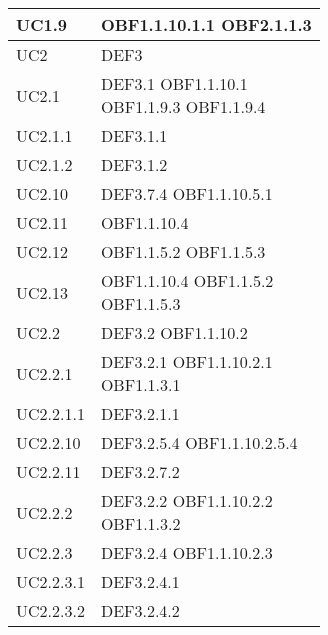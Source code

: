 \documentclass{scalatekids-article}
\begin{document}
\begin{longtable}[H]{|p{5.5cm}|p{5.5cm}|}
\hline
UC1.9 & \multiLineCell[t]{OBF1.1.10.1.1 OBF2.1.1.3\\}\\
\hline
UC2 & \multiLineCell[t]{DEF3\\}\\
\hline
UC2.1 & \multiLineCell[t]{DEF3.1 OBF1.1.10.1\\OBF1.1.9.3 OBF1.1.9.4\\}\\
\hline
UC2.1.1 & \multiLineCell[t]{DEF3.1.1\\}\\
\hline
UC2.1.2 & \multiLineCell[t]{DEF3.1.2\\}\\
\hline
UC2.10 & \multiLineCell[t]{DEF3.7.4 OBF1.1.10.5.1\\}\\
\hline
UC2.11 & \multiLineCell[t]{OBF1.1.10.4\\}\\
\hline
UC2.12 & \multiLineCell[t]{OBF1.1.5.2 OBF1.1.5.3\\}\\
\hline
UC2.13 & \multiLineCell[t]{OBF1.1.10.4 OBF1.1.5.2\\OBF1.1.5.3}\\
\hline
UC2.2 & \multiLineCell[t]{DEF3.2 OBF1.1.10.2\\}\\
\hline
UC2.2.1 & \multiLineCell[t]{DEF3.2.1 OBF1.1.10.2.1\\OBF1.1.3.1}\\
\hline
UC2.2.1.1 & \multiLineCell[t]{DEF3.2.1.1\\}\\
\hline
UC2.2.10 & \multiLineCell[t]{DEF3.2.5.4 OBF1.1.10.2.5.4\\}\\
\hline
UC2.2.11 & \multiLineCell[t]{DEF3.2.7.2\\}\\
\hline
UC2.2.2 & \multiLineCell[t]{DEF3.2.2 OBF1.1.10.2.2\\OBF1.1.3.2\\}\\
\hline
UC2.2.3 & \multiLineCell[t]{DEF3.2.4 OBF1.1.10.2.3\\}\\
\hline
UC2.2.3.1 & \multiLineCell[t]{DEF3.2.4.1\\}\\
\hline
UC2.2.3.2 & \multiLineCell[t]{DEF3.2.4.2\\}\\
\hline

\end{longtable}
\end{document}
